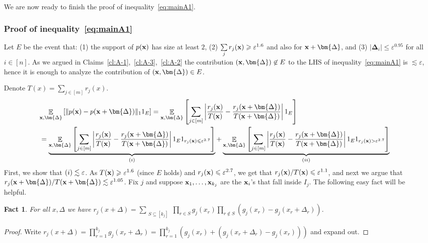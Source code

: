 \documentclass[10pt,a4paper]{article}
\newtheorem{fact}[thm]{Fact}
\newcommand\card[1]{\left| {#1} \right|}
\newcommand\Expect[2]{{\mathop{\mathbb{E}}_{#1}\left[ {#2} \right]}}
\newcommand\norm[1]{\| #1 \|}
\newcommand\eps{\varepsilon}
\renewcommand\geq{\geqslant}
\renewcommand\leq{\leqslant}
\newcommand{\rom}[1]{\uppercase\expandafter{\romannumeral #1\relax}}
\newcommand{\De}{\Delta}
\def\ll{\lesssim}
\begin{document}
We are now ready to finish the proof of inequality~\eqref{eq:mainA1}.
\subsubsection*{Proof of inequality~\eqref{eq:mainA1}}
Let $E$ be the event that:
(1) the support of $p({\bf x})$ has size at least $2$,
(2) $\sum\limits_{j} r_j({\bf x})\geq \eps^{1.6}$ and also for ${\bf x}+\bm{\De}$,
and (3) $\card{\bm{\De}_i}\leq \eps^{0.95}$ for all $i\in[n]$.
As we argued in Claims~\ref{cl:A-1},~\ref{cl:A-3},~\ref{cl:A-2} the contribution $({\bf x},\bm{\De})\not\in E$ to
the LHS of inequality~\eqref{eq:mainA1} is $\ll \eps$, hence it is enough to analyze the contribution of $({\bf x},\bm{\De})\in E$.


Denote $T(x) = \sum\limits_{j\in [m]} r_j(x)$.
\begin{align*}
&\Expect{{\bf x},\bm{\De}}{\norm{p({\bf x}) - p({\bf x}+\bm{\De})}_1 1_E}
= \Expect{{\bf x},\bm{\De}}{\sum\limits_{j\in [m]}\card{\frac{r_j({\bf x})}{T({\bf x})}-\frac{r_j({\bf x}+\bm{\De})}{T({\bf x}+\bm{\De})}} 1_E}\\
&= \underbrace{\Expect{{\bf x},\bm{\De}}{\sum\limits_{j\in [m]}\card{\frac{r_j({\bf x})}{T({\bf x})}-\frac{r_j({\bf x}+\bm{\De})}{T({\bf x}+\bm{\De})}}
1_E 1_{r_j({\bf x}) \leq \eps^{2.7}}}}_{(\rom{1})}
+\underbrace{\Expect{{\bf x},\bm{\De}}{\sum\limits_{j\in [m]}\card{\frac{r_j({\bf x})}{T({\bf x})}-\frac{r_j({\bf x}+\bm{\De})}{T({\bf x}+\bm{\De})}}
1_E 1_{r_j({\bf x}) >\eps^{2.7}}}}_{(\rom{2})}
\end{align*}
First, we show that $(\rom{1})\ll \eps$. As $T({\bf x})\geq \eps^{1.6}$ (since $E$ holds) and $r_j({\bf x})\leq \eps^{2.7}$, we get that
$r_j({\bf x})/T({\bf x})\leq \eps^{1.1}$, and next we argue that $r_j({\bf x}+\bm{\De})/T({\bf x}+\bm{\De})\ll \eps^{1.05}$.
Fix $j$ and suppose ${\bf x}_1,\ldots,{\bf x}_{k_j}$ are the ${\bf x}_i$'s that fall inside $I_j$. The following easy fact will be helpful.

\begin{fact}\label{fact:general}
  For all $x,\De$ we have
  $r_j(x+\De) = \sum\limits_{\substack{S\subseteq[k_j]}}{
  \prod\limits_{r\in S}{g_j(x_r)}
  \prod\limits_{r\not\in S}{(g_j(x_r)-g_j(x_r+\De_r))}}$.
\end{fact}
\begin{proof}
  Write $r_j(x+\De) =
  \prod\limits_{r=1}^{k_j} g_j(x_r+\De_r)
  =\prod\limits_{r=1}^{k_j}\left(g_j(x_r) + (g_j(x_r+\De_r)-g_j(x_r))\right)$
  and expand out.
\end{proof}
\end{document}
